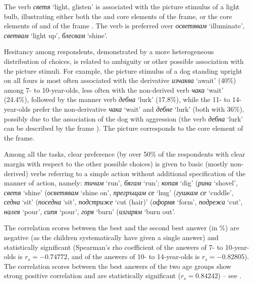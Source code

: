 \documentclass[output=paper,colorlinks,citecolor=brown]{langscibook}
\begin{document}
The verb \textit{светя} `light, glisten' is associated with the picture stimulus of a light bulb, illustrating either both the  and  core elements of the  frame, or the core elements of  and  of the frame . The verb is preferred over \textit{осветявам} `illuminate', \textit{светвам} `light up', \textit{блесвам} `shine'. 

Hesitancy among respondents, demonstrated by a more heterogeneous distribution of choices, is related to ambiguity or other possible association with the picture stimuli. For example, the picture stimulus of a dog standing upright on all fours is most often associated with the derivative \textit{изчаква} `await' (40\%) among 7- to 10-year-olds, less often with the non-derived verb \textit{чака} `wait' (24.4\%), followed by the manner verb \textit{дебна} `lurk' (17.8\%), while the 11- to 14-year-olds prefer the non-derivative \textit{чака} `wait' and \textit{дебне} `lurk' (both with 36\%), possibly due to the association of the dog with aggression (the verb \textit{дебна} `lurk' can be described by the frame ). The picture corresponds to the  core element of the  frame. 

Among all the tasks, clear preference (by over 50\% of the respondents with clear margin with respect to the other possible choices) is given to basic (mostly non-derived) verbs referring to a simple action without additional specification of the manner of action, namely: \textit{тичам} `run', \textit{бягам} `run'; \textit{копая} `dig' (\textit{рина} `shovel', \textit{светя} `shine' (\textit{осветявам} `shine on', \textit{прегръщам се} `hug' (\textit{гуш\-кам се} `cuddle', \textit{седна} `sit' (\textit{поседна} `sit', \textit{подстриже} `cut (hair)' (\textit{оформя} `form', \textit{подрежа} `cut', \textit{налея} `pour', \textit{сипя} `pour', \textit{горя} `burn' (\textit{изгарям} `burn out'. 


The correlation scores between the best and the second best answer (in \%) are negative (as the children systematically have given a single answer) and statistically significant (Spearman’s rho coefficient of the answers of 7- to 10-year-olds is $r_s = -0.74772$, and of the answers of 10- to 14-year-olds is $r_s = -0.82805$). The correlation scores between the best answers of the two age groups show strong positive correlation and are statistically significant ($r_s =0.84242$) -- see .
\end{document}
